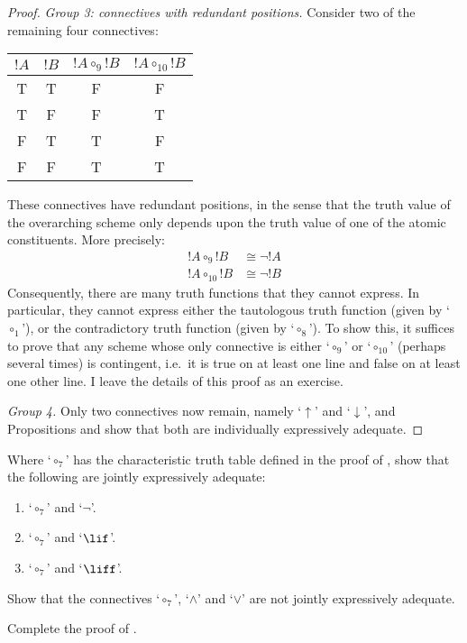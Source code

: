 \documentclass[../../../include/open-logic-section]{subfiles}
\begin{document}
\begin{thm}
\begin{proof}
		\emph{Group 3: connectives with redundant positions.} 
		Consider two of the remaining four connectives:
		
	\begin{center}
		\begin{tabular}{c c | c c}
		${!A}$ & ${!B}$ & ${!A} \mathrel{\circ_9} {!B}$ & ${!A} \mathrel{\circ_{10}} {!B}$\\
		\hline
			 T & T & F & F \\
			 T & F & F & T\\
			 F & T & T & F \\
			 F & F & T & T
	\end{tabular}
	\end{center}
	These connectives have redundant positions, in the sense that the truth value of the overarching scheme only depends upon the truth value of one of the atomic constituents. More precisely:
		\begin{align*}
		 	{!A} \circ_9 {!B} &\cong \lnot {!A}\\
			{!A} \circ_{10} {!B} &\cong \lnot {!B}
		\end{align*}
		Consequently, there are many truth functions that they cannot express. In particular, they cannot express either the tautologous truth function (given by `$\circ_1$'), or the contradictory truth function (given by `$\circ_8$'). To show this, it suffices to prove that any scheme whose only connective is either `$\circ_9$' or `$\circ_{10}$' (perhaps several times) is contingent, i.e.\ it is true on at least one line and false on at least one other line. I leave the details of this proof as an exercise.
		
		\emph{Group 4.} Only two connectives now remain, namely `$\uparrow$' and `$\downarrow$', and 	Propositions  and  show that both are individually expressively adequate.
		\end{proof}
	\end{thm}

\begin{prob}
 Where `$\circ_7$' has the characteristic truth table defined in the proof of , show that the following are jointly expressively adequate:
	\begin{enumerate}
		\item `$\circ_7$' and `$\lnot$'. %
		\item `$\circ_7$' and `$\lif$'. %
		\item `$\circ_7$' and `$\liff$'. %
	\end{enumerate}
\end{prob}

\begin{prob}
Show that the connectives `$\circ_7$', `$\land$' and `$\lor$' are not jointly expressively adequate.\\
\end{prob}

\begin{prob}
Complete the proof of .
\end{prob}

 
\end{document}
